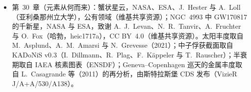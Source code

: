 \begin{itemize}
  \item 第~30~章（元素从何而来）：蟹状星云，NASA、ESA、J.~Hester 与 A.~Loll（亚利桑那州立大学），公有领域（维基共享资源）；NGC~4993 中 GW170817 的千新星，NASA 与 ESA，致谢 A.~J.~Levan、N.~R.~Tanvir、A.~Fruchter 与 O.~Fox（哈勃，heic1717a），CC BY~4.0（维基共享资源）。太阳丰度取自 M.~Asplund、A.~M.~Amarsi 与 N.~Grevesse（2021）；中子俘获截面取自 KADoNiS v0.3（I.~Dillmann、R.~Plag、F.~K\"appeler 与 T.~Rauscher）；半衰期取自 IAEA 核素图表（ENSDF）；Geneva--Copenhagen 巡天的金属丰度取自 L.~Casagrande 等（2011）的再分析，由斯特拉斯堡 CDS 发布（VizieR J/A+A/530/A138）。
\end{itemize}

